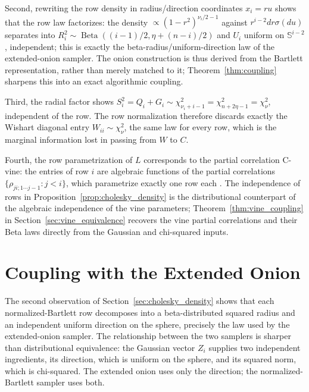 \documentclass[12pt,english]{article}
\theoremstyle{plain} %
\theoremstyle{definition} %
\theoremstyle{remark} %
\begin{document}
Second, rewriting the row density in radius/direction coordinates $x_i=ru$ shows that the row law factorizes: the density $\propto(1-r^2)^{\nu_i/2-1}$ against $r^{i-2}dr\sigma(du)$ separates into $R_i^2\sim\operatorname{Beta}((i-1)/2,\eta+(n-i)/2)$ and $U_i$ uniform on $\mathbb{S}^{i-2}$, independent; this is exactly the beta-radius/uniform-direction law of the extended-onion sampler. The onion construction is thus derived from the Bartlett representation, rather than merely matched to it; Theorem~\ref{thm:coupling} sharpens this into an exact algorithmic coupling.

Third, the radial factor shows $S_i^2=Q_i+G_i\sim\chi^2_{\nu_i+i-1}=\chi^2_{n+2\eta-1}=\chi^2_{\nu}$, independent of the row. The row normalization therefore discards exactly the Wishart diagonal entry $W_{ii}\sim\chi^2_\nu$, the same law for every row, which is the marginal information lost in passing from $W$ to $C$.

Fourth, the row parametrization of $L$ corresponds to the partial correlation C-vine: the entries of row $i$ are algebraic functions of the partial correlations $\{\rho_{ji;1\cdots j-1}:j<i\}$, which parametrize exactly one row each \citep[Appendix~A.4]{JoeKurowicka:2026}. The independence of rows in Proposition~\ref{prop:cholesky_density} is the distributional counterpart of the algebraic independence of the vine parameters; Theorem~\ref{thm:vine_coupling} in Section~\ref{sec:vine_equivalence} recovers the vine partial correlations and their Beta laws directly from the Gaussian and chi-squared inputs.

\section{Coupling with the Extended Onion}
\label{sec:onion_equivalence}

The second observation of Section~\ref{sec:cholesky_density} shows that each normalized-Bartlett row decomposes into a beta-distributed squared radius and an independent uniform direction on the sphere, precisely the law used by the extended-onion sampler. The relationship between the two samplers is sharper than distributional equivalence: the Gaussian vector $Z_i$ supplies two independent ingredients, its direction, which is uniform on the sphere, and its squared norm, which is chi-squared. The extended onion uses only the direction; the normalized-Bartlett sampler uses both.
\end{document}
